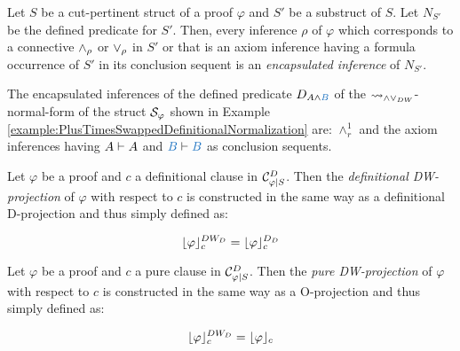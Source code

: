 \documentclass{llncs}
\begin{document}
\begin{definition}
\label{definition:EncapsulatedInferences}
Let $S$ be a cut-pertinent struct of a proof $\varphi$ and $S'$ be a substruct of $S$. Let $N_{S'}$ be the defined predicate for $S'$. Then, every inference $\rho$ of $\varphi$ which corresponds to a connective $\wedge_{\rho}$ or $\vee_{\rho}$ in $S'$ or that is an axiom inference having a formula occurrence of $S'$ in its conclusion sequent is an \emph{encapsulated inference} of $N_{S'}$.
\end{definition}

\begin{example}
\label{example:EncapsulatedInferences}


The encapsulated inferences of the defined predicate $D_{\hA{A} \structplus \hB{B}}$ of the $\leadsto_{\wedge\vee_{DW}}$-normal-form of the struct $\mathcal{S}_{\varphi}$ shown in Example \ref{example:PlusTimesSwappedDefinitionalNormalization} are: $\wedge^1_r$ and the axiom inferences having $A \vdash A$ and $\hB{B} \seq \hB{B}$ as conclusion sequents.
\end{example}


\begin{definition}
\label{definition:DWProjectionDefinitional}
Let $\varphi$ be a proof and $c$ a definitional clause in $\mathcal{C}^{D}_{\varphi|S}$. Then the \emph{definitional DW-projection} of $\varphi$ with respect to $c$ is constructed in the same way as a definitional D-projection and thus simply defined as:

$$
\lfloor \varphi \rfloor_{c}^{DW_D} = \lfloor \varphi \rfloor_{c}^{D_D}
$$
\end{definition}


\begin{definition}
\label{definition:DWProjectionPure}
Let $\varphi$ be a proof and $c$ a pure clause in $\mathcal{C}^{D}_{\varphi|S}$. Then the \emph{pure DW-projection} of $\varphi$ with respect to $c$ is constructed in the same way as a O-projection and thus simply defined as:

$$
\lfloor \varphi \rfloor_{c}^{DW_D} = \lfloor \varphi \rfloor_{c}
$$
\end{definition}
\end{document}
